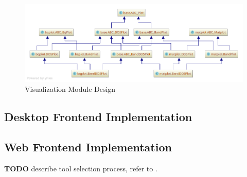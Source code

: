 \begin{figure}[htb!]
    \centering
    \includegraphics[width=0.8\linewidth]{img/pycharm_uml/matplot.png}
    \caption{Visualization Module Design}
    \label{fig:visualization-module}
\end{figure}

\subsection{Desktop Frontend Implementation}
\label{sec:desktop-frontend}

\subsection{Web Frontend Implementation}
\label{sec:web-frontend}

\textbf{TODO} describe tool selection process, refer to \cite{jw-notes}.





